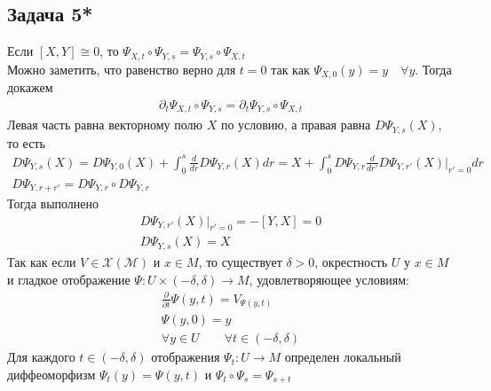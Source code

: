 \subsection*{Задача 5*}
	Если $[X,Y] \cong 0$, то $\Psi_{X,t} \circ \Psi_{Y,s} = \Psi_{Y,s} \circ \Psi_{X,t}$\\
	Можно заметить, что равенство верно для $t = 0$ так как $\Psi_{X,0}(y) = y\quad \forall y$. Тогда докажем
	\begin{gather*}
		\partial_t \Psi_{X,t} \circ \Psi_{Y,s} = \partial_t \Psi_{Y,s} \circ \Psi_{X,t}
	\end{gather*}
	Левая часть равна векторному полю $X$ по условию, а правая равна $D \Psi_{Y,s} (X)$, то есть
	\begin{gather*}
		D\Psi_{Y,s}(X) = 
		D\Psi_{Y,0}(X) + \int_{0}^{s} \frac{d}{d r} D \Psi_{Y,r} (X) dr =
		X + \int_{0}^{s} D\Psi_{Y,r} \frac{d}{d r'} D\Psi_{Y,r'}(X)|_{r'= 0} dr\\
		D\Psi_{Y, r+r'} = D\Psi_{Y,r} \circ D\Psi_{Y,r}
	\end{gather*}
	Тогда выполнено
	\begin{gather*}
		D\Psi_{Y,r'}(X)|_{r'= 0} = -[Y,X] = 0\\
		D\Psi_{Y,s}(X) = X
	\end{gather*}
	Так как если $V \in \mathcal{X}(\mathcal{M})$ и $x \in M$, то существует $\delta > 0$, окрестность $U$ у $x \in M$ и гладкое отображение $\Psi: U \times (-\delta, \delta) \to M$, удовлетворяющее условиям:
	\begin{gather*}
		\frac{\partial}{\partial t} \Psi(y,t) = V_{\Psi(y,t)}\\
		\Psi(y,0) = y\\
		\forall y \in U\qquad \forall t \in (-\delta, \delta)
	\end{gather*}
	Для каждого $t \in (-\delta, \delta)$ отображения $\Psi_{t}: U \to M$ определен локальный диффеоморфизм $\Psi_t(y) = \Psi(y,t)$ и $\Psi_t \circ \Psi_s = \Psi_{s+t}$
\vskip0.5in


